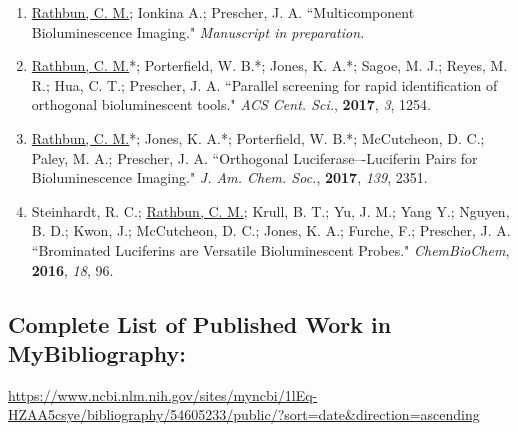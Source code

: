 \documentclass{nihbiosketch}
\begin{document}
\begin{enumerate}
\begin{enumerate}

  \item \underline{Rathbun, C. M.}; Ionkina A.; Prescher, J. A. ``Multicomponent Bioluminescence Imaging."  \textit{Manuscript in preparation.}

  \item \underline{Rathbun, C. M.}*; Porterfield, W. B.*; Jones, K. A.*; Sagoe, M. J.; Reyes, M. R.; Hua, C. T.; Prescher, J. A. ``Parallel screening for rapid identification of orthogonal bioluminescent tools." \textit{ACS Cent. Sci.}, \textbf{2017}, \textit{3}, 1254.


  \item \underline{Rathbun, C. M.}*; Jones, K. A.*; Porterfield, W. B.*; McCutcheon, D. C.; Paley, M. A.; Prescher, J. A. ``Orthogonal Luciferase–-Luciferin Pairs for Bioluminescence Imaging." \textit{J. Am. Chem. Soc.}, \textbf{2017}, \textit{139}, 2351.

  \item Steinhardt, R. C.; \underline{Rathbun, C. M.}; Krull, B. T.; Yu, J. M.; Yang Y.; Nguyen, B. D.; Kwon, J.; McCutcheon, D. C.; Jones, K. A.; Furche, F.; Prescher, J. A. ``Brominated Luciferins are Versatile Bioluminescent Probes." \textit{ChemBioChem}, \textbf{2016}, \textit{18}, 96. %


\end{enumerate}

\end{enumerate}

\subsection*{Complete List of Published Work in MyBibliography:}
\url{https://www.ncbi.nlm.nih.gov/sites/myncbi/1lEq-HZAA5csye/bibliography/54605233/public/?sort=date&direction=ascending}
\end{document}
